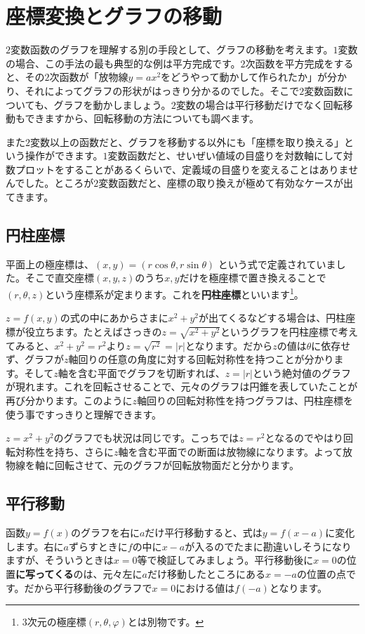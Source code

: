 \section{座標変換とグラフの移動}

$2$変数函数のグラフを理解する別の手段として、グラフの移動を考えます。$1$変数の場合、この手法の最も典型的な例は平方完成です。$2$次函数を平方完成をすると、その$2$次函数が「放物線$y=ax^2$をどうやって動かして作られたか」が分かり、それによってグラフの形状がはっきり分かるのでした。そこで$2$変数函数についても、グラフを動かしましょう。$2$変数の場合は平行移動だけでなく回転移動もできますから、回転移動の方法についても調べます。

また$2$変数以上の函数だと、グラフを移動する以外にも「座標を取り換える」という操作ができます。$1$変数函数だと、せいぜい値域の目盛りを対数軸にして対数プロットをすることがあるくらいで、定義域の目盛りを変えることはありませんでした。ところが$2$変数函数だと、座標の取り換えが極めて有効なケースが出てきます。

\subsection{円柱座標}
平面上の極座標は、$(x,y) = (r\cos\theta, r\sin\theta)$ という式で定義されていました。そこで直交座標$(x,y,z)$のうち$x, y$だけを極座標で置き換えることで$(r,\theta,z)$という座標系が定まります。これを\textbf{円柱座標}といいます\footnote{$3$次元の極座標$(r,\theta,\varphi)$とは別物です。}。

$z=f(x,y)$の式の中にあからさまに$x^2+y^2$が出てくるなどする場合は、円柱座標が役立ちます。たとえばさっきの$z=\sqrt{x^2+y^2}$というグラフを円柱座標で考えてみると、$x^2+y^2=r^2$より$z=\sqrt{r^2}=|r|$となります。だから$z$の値は$\theta$に依存せず、グラフが$z$軸回りの任意の角度に対する回転対称性を持つことが分かります。そして$z$軸を含む平面でグラフを切断すれば、$z=|r|$という絶対値のグラフが現れます。これを回転させることで、元々のグラフは円錐を表していたことが再び分かります。このように$z$軸回りの回転対称性を持つグラフは、円柱座標を使う事ですっきりと理解できます。

$z=x^2+y^2$のグラフでも状況は同じです。こっちでは$z=r^2$となるのでやはり回転対称性を持ち、さらに$z$軸を含む平面での断面は放物線になります。よって放物線を軸に回転させて、元のグラフが回転放物面だと分かります。

\subsection{平行移動}
函数$y=f(x)$のグラフを右に$a$だけ平行移動すると、式は$y=f(x-a)$に変化します。右に$a$ずらすときに$f$の中に$x-a$が入るのでたまに勘違いしそうになりますが、そういうときは$x=0$等で検証してみましょう。平行移動後に$x=0$の位置\textbf{に写ってくる}のは、元々左に$a$だけ移動したところにある$x=-a$の位置の点です。だから平行移動後のグラフで$x=0$における値は$f(-a)$となります。

